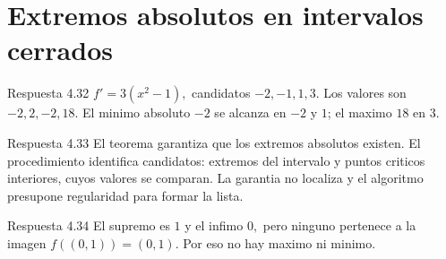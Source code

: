 \documentclass[10pt,a4paper,oneside,openany]{book}
\begin{document}
\section{Extremos absolutos en intervalos cerrados}
\begin{PSevenAnswerFixed}{Respuesta 4.32}
\(f'=3(x^{2}-1),\) candidatos \(-2,-1,1,3\). Los valores son \(-2,2,-2,18\). El minimo absoluto \(-2\) se alcanza en \(-2\) y \(1\); el maximo \(18\) en \(3\).
\end{PSevenAnswerFixed}
\begin{PSevenAnswerFixed}{Respuesta 4.33}
El teorema garantiza que los extremos absolutos existen. El procedimiento identifica candidatos: extremos del intervalo y puntos criticos interiores, cuyos valores se comparan. La garantia no localiza y el algoritmo presupone regularidad para formar la lista.
\end{PSevenAnswerFixed}
\begin{PSevenAnswerFixed}{Respuesta 4.34}
El supremo es \(1\) y el infimo \(0,\) pero ninguno pertenece a la imagen \(f((0,1))=(0,1)\). Por eso no hay maximo ni minimo.
\end{PSevenAnswerFixed}
\end{document}
